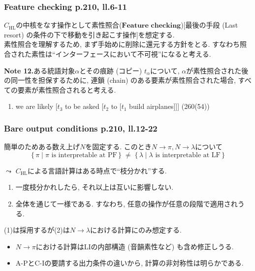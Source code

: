 \documentclass[dvipdfmx, xcolor={dvipsnames},12pt]{beamer}
\begin{document}
\begin{frame}
\frametitle{Feature checking p.210, ll.6-11}

$C_{\mathrm{HL}}$の中核をなす操作として$\textbf{素性照合}$($\textbf{Feature checking}$)[最後の手段 (Last resort) の条件の下で移動を引き起こす操作]を想定する.\\
素性照合を理解するため, まず手始めに削除に還元する方針をとる. すなわち照合された素性は``インターフェースにおいて不可視''になると考える.


\begin{marker}
\textbf{Note 12.}\;ある統語対象$\alpha$とその痕跡 (コピー) $t_{\alpha}$について, $\alpha$が素性照合された後の同一性を担保するために, 連鎖 (chain) のある要素が素性照合された場合, すべての要素が素性照合されると考える.
\end{marker}

\qquad
\begin{enumerate}
\item [(c)] we are likely [$t_{3}$ to be asked [$t_{2}$ to [$t_{1}$ build airplanes]]] (260(54))
\end{enumerate}


\end{frame}


\begin{frame}
\frametitle{Bare output conditions p.210, ll.12-22}
簡単のためある数え上げ$N$を固定する. このとき$N \to \pi, N \to \lambda$について
\[
\{\, \pi \mid \pi \text{ is interpretable at PF} \,\}
\;\neq\;
\{\, \lambda \mid \lambda \text{ is interpretable at LF} \,\}
\]

$\leadsto$ $C_{\mathrm{HL}}$による言語計算はある時点で``枝分かれ''する.\\

\begin{enumerate}

\item[(1)] 一度枝分かれしたら, それ以上は互いに影響しない.
\item[(2)] 全体を通じて一様である. すなわち, 任意の操作が任意の段階で適用されうる.

\end{enumerate}
(1)は採用するが(2)は$N \to \lambda$における計算にのみ想定する. 
\begin{itemize}
\item $N \to \pi$における計算はLIの内部構造 (音韻素性など) も含め修正しうる.
\item A-PとC-Iの要請する出力条件の違いから, 計算の非対称性は明らかである.
\end{itemize}


\end{frame}
\end{document}
